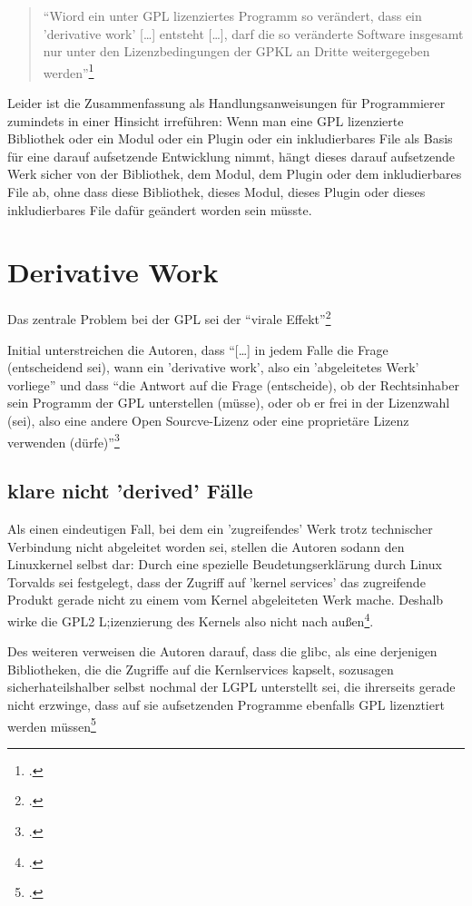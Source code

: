 \documentclass[DIV=calc,BCOR=5mm,11pt,headings=small,oneside,abstract=true, toc=bib]{scrartcl}
\begin{document}
\begin{quote}
\enquote{Wiord ein unter GPL lizenziertes Programm so verändert, dass ein
'derivative work' [\ldots] entsteht [\ldots], darf die so veränderte Software
insgesamt nur unter den Lizenzbedingungen der GPKL an Dritte weitergegeben
werden}\footcite[cf.][17]{ifross2005a}
\end{quote}

Leider ist die Zusammenfassung als Handlungsanweisungen für Programmierer
zumindets in einer Hinsicht irreführen: Wenn man eine GPL lizenzierte Bibliothek
oder ein Modul oder ein Plugin oder ein inkludierbares File als Basis für eine
darauf aufsetzende Entwicklung nimmt, hängt dieses darauf aufsetzende Werk
sicher von der Bibliothek, dem Modul, dem Plugin oder dem inkludierbares File
ab, ohne dass diese Bibliothek, dieses Modul, dieses Plugin oder dieses
inkludierbares File dafür geändert worden sein müsste.

\section{Derivative Work}

Das zentrale Problem bei der GPL sei der \enquote{virale
Effekt}\footcite[cf.][64]{ifross2005a}

Initial unterstreichen die Autoren, dass \enquote{[\ldots] in jedem Falle die
Frage (entscheidend sei), wann  ein 'derivative work', also ein 'abgeleitetes
Werk' vorliege} und dass \enquote{die Antwort auf die Frage (entscheide), ob
der Rechtsinhaber sein Programm der GPL unterstellen (müsse), oder ob er frei in
der Lizenzwahl (sei), also eine andere Open Sourcve-Lizenz oder eine proprietäre
Lizenz verwenden (dürfe)}\footcite[cf.][64]{ifross2005a}

\subsection{klare nicht 'derived' Fälle}
Als einen eindeutigen Fall, bei dem ein 'zugreifendes' Werk trotz technischer
Verbindung nicht abgeleitet worden sei, stellen die Autoren sodann den
Linuxkernel selbst dar: Durch eine spezielle Beudetungserklärung durch Linux
Torvalds sei festgelegt, dass der Zugriff auf 'kernel services' das zugreifende
Produkt gerade nicht zu einem vom Kernel abgeleiteten Werk mache. Deshalb wirke
die GPL2 L;izenzierung des Kernels also nicht nach
außen\footcite[cf.][66]{ifross2005a}.

Des weiteren verweisen die Autoren darauf, dass die glibc, als eine derjenigen
Bibliotheken, die die Zugriffe auf die Kernlservices kapselt, sozusagen
sicherhateilshalber selbst nochmal der LGPL unterstellt sei, die ihrerseits
gerade nicht erzwinge, dass auf sie aufsetzenden Programme ebenfalls GPL
lizenztiert werden müssen\footcite[cf.][66]{ifross2005a}
\end{document}
